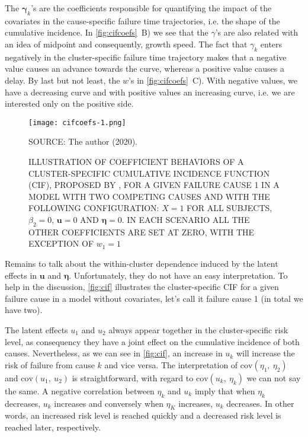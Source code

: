 The \(\bm{\gamma}_{k}\)'s are the coefficients responsible for
quantifying the impact of the covariates in the cause-specific failure
time trajectories, i.e. the shape of the cumulative incidence. In
\autoref{fig:cifcoefs}~B) we see that the \(\gamma\)'s are also related
with an idea of midpoint and consequently, growth speed. The fact that
\(\gamma_{k}\) enters negatively in the cluster-specific failure time
trajectory makes that a negative value causes an advance towards the
curve, whereas a positive value causes a delay. By last but not least,
the \(w\)'s in \autoref{fig:cifcoefs}~C). With negative values, we have
a decreasing curve and with positive values an increasing curve, i.e. we
are interested only on the positive side.

\begin{figure}[H]
  \setlength{\abovecaptionskip}{.0001pt}
  \caption{ILLUSTRATION OF COEFFICIENT BEHAVIORS OF A CLUSTER-SPECIFIC
    CUMULATIVE INCIDENCE FUNCTION (CIF), PROPOSED BY
    , FOR A GIVEN FAILURE CAUSE 1 IN A MODEL WITH
    TWO COMPETING CAUSES AND WITH THE FOLLOWING CONFIGURATION: \(X = 1\)
    FOR ALL SUBJECTS, \(\beta_{2} = 0\), \(\bm{u} = 0\) AND \(\bm{\eta}
    = 0\). IN EACH SCENARIO ALL THE OTHER COEFFICIENTS ARE SET AT ZERO,
    WITH THE EXCEPTION OF \(w_{1} = 1\)}
  \vspace{0.3cm} \centering
  \texttt{[image: cifcoefs-1.png]}
  \\
  \vspace{0.1cm}
  \begin{footnotesize}
    SOURCE: The author (2020).
  \end{footnotesize}
  \label{fig:cifcoefs}
\end{figure}

Remains to talk about the within-cluster dependence induced by the
latent effects in \(\bm{u}\) and \(\bm{\eta}\). Unfortunately, they do
not have an easy interpretation. To help in the discussion,
\autoref{fig:cif} illustrates the cluster-specific CIF for a given
failure cause in a model without covariates, let's call it failure cause
1 (in total we have two).

The latent effects \(u_{1}\) and \(u_{2}\) always appear together in the
cluster-specific risk level, as consequency they have a joint effect on
the cumulative incidence of both causes. Nevertheless, as we can see in
\autoref{fig:cif}, an increase in \(u_{k}\) will increase the risk of
failure from cause \(k\) and vice versa. The interpretation of
\(\text{cov}(\eta_{1},~\eta_{2})\) and \(\text{cov}(u_{1},~u_{2})\) is
straightforward, with regard to \(\text{cov}(u_{k},~\eta_{k})\) we can
not say the same. A negative correlation between \(\eta_{k}\) and
\(u_{k}\) imply that when \(\eta_{k}\) decreases, \(u_{k}\) increases
and conversely when \(\eta_{K}\) increases, \(u_{k}\) decreases. In
other words, an increased risk level is reached quickly and a decreased
risk level is reached later, respectively.

